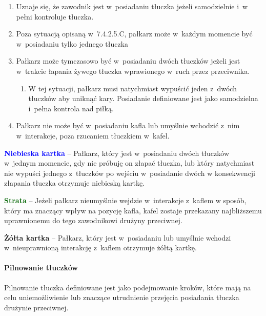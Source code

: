 \documentclass[12pt]{article}
\newcommand\yellowcard[1]{\bgroup\textcolor{darkyellow}{\textbf{#1}}}
\newcommand\bluecard[1]{\bgroup\textcolor{blue}{\textbf{#1}}}
\newcommand\other[1]{\bgroup\textcolor{darkgreen}{\textbf{#1}}}
\begin{document}
\begin{enumerate}
	\item
	      Uznaje się, że zawodnik jest w~posiadaniu tłuczka jeżeli samodzielnie
	      i~w pełni kontroluje tłuczka.
	\item
	      Poza sytuacją opisaną w~7.4.2.5.C, pałkarz może w~każdym momencie być
	      w~posiadaniu tylko jednego tłuczka
	\item
	      Pałkarz może tymczasowo być w~posiadaniu dwóch tłuczków jeżeli jest w~trakcie łapania żywego tłuczka wprawionego w~ruch przez przeciwnika.

	      \begin{enumerate}
		      \item
		            W tej sytuacji, pałkarz musi natychmiast wypuścić jeden z~dwóch
		            tłuczków aby uniknąć kary. Posiadanie definiowane jest jako
		            samodzielna i~pełna kontrola nad piłką.
	      \end{enumerate}
	\item
	      Pałkarz nie może być w~posiadaniu kafla lub umyślnie wchodzić z~nim w~interakcje, poza rzucaniem tłuczkiem w~kafel.
\end{enumerate}

\bluecard{Niebieska kartka} -- Pałkarz, który jest w~posiadaniu dwóch
tłuczków w~jednym momencie, gdy nie próbuję on złapać tłuczka, lub który
natychmiast nie wypuści jednego z~tłuczków po wejściu w~posiadanie dwóch
w konsekwencji złapania tłuczka otrzymuje niebieską kartkę.

\other{Strata} -- Jeżeli pałkarz nieumyślnie wejdzie w~interakcje z~kaflem
w sposób, który ma znaczący wpływ na pozycję kafla, kafel zostaje
przekazany najbliższemu uprawnionemu do tego zawodnikowi drużyny
przeciwnej.

\yellowcard{Żółta kartka} -- Pałkarz, który jest w~posiadaniu lub umyślnie
wchodzi w~nieuprawnioną interakcję z~kaflem otrzymuje żółtą kartkę.

\paragraph{Pilnowanie tłuczków}
Pilnowanie tłuczka definiowane
jest jako podejmowanie kroków, które mają na celu uniemożliwienie lub
znaczące utrudnienie przejęcia posiadania tłuczka drużynie przeciwnej.
\end{document}
